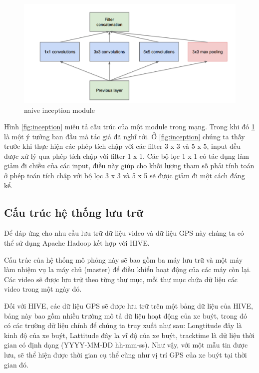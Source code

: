 	\begin{figure}[h!]
			\centering
			\includegraphics[scale=0.3]{charts/inception_nai.png}
			\caption{naive inception module \cite{1}}
			\label{fig:nai_inception}
	\end{figure}
	
	Hình \ref{fig:inception} miêu tả cấu trúc của một module trong mạng. Trong khi đó \ref{fig:nai_inception} là một ý tưởng ban đầu mà tác giả đã nghĩ tới. Ở \ref{fig:inception} chúng ta thấy trước khi thực hiện các phép tích chập với các filter 3 x 3 và 5 x 5, input đều được xử lý qua phép tích chập với filter 1 x 1. Các bộ lọc 1 x 1 có tác dụng làm giảm đi chiều của các input\cite{2}, điều này giúp cho khối lượng tham số phải tính toán ở phép toán tích chập với bộ lọc 3 x 3 và 5 x 5 sẽ được giảm đi một cách đáng kể.
	
	\subsection{Cấu trúc hệ thống lưu trữ}
	Để đáp ứng cho nhu cầu lưu trữ dữ liệu video và dữ liệu GPS này chúng ta có thể sử dụng Apache Hadoop kết hợp với HIVE.\par 
	Cấu trúc của hệ thống mô phỏng này sẽ bao gồm ba máy lưu trữ và một máy làm nhiệm vụ la máy chủ (master) để điều khiển hoạt động của các máy còn lại. Các video sẽ được lưu trữ theo từng thư mục, mỗi thư mục chứa dữ liệu các video trong một ngày đó.\par 
	Đối với HIVE, các dữ liệu GPS sẽ được lưu trữ trên một bảng dữ liệu của HIVE, bảng này bao gồm nhiều trường mô tả dữ liệu hoạt động của xe buýt, trong đó có các trường dữ liệu chính để chúng ta truy xuất như sau: Longtitude đây là kinh độ của xe buýt, Lattitude đây la vĩ độ của xe buýt, tracktime là dữ liệu thời gian có định dạng (YYYY-MM-DD hh-mm-ss). Như vậy, với một mẫu tin được lưu, sẽ thể hiện được thời gian cụ thể cũng như vị trí GPS của xe buýt tại thời gian đó.
